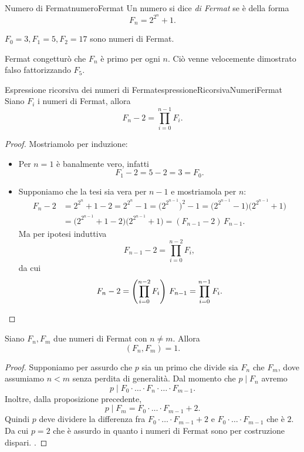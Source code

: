 	\begin{defn}{Numero di Fermat}{numeroFermat}
	Un numero si dice \emph{di Fermat} se è della forma
		\[
		F_n = 2^{2^n}+1.
		\]
	\end{defn}

	\begin{ese}
	\(F_0=3,F_1=5,F_2=17\) sono numeri di Fermat.
	\end{ese}

	\begin{oss}
	Fermat congetturò che \(F_n\) è primo per ogni \(n\).
	Ciò venne velocemente dimostrato falso fattorizzando \(F_5\).
	\end{oss}

	\begin{prop}{Espressione ricorsiva dei numeri di Fermat}{espressioneRicorsivaNumeriFermat}
	Siano \(F_i\) i numeri di Fermat, allora
		\[
		F_n-2 = \prod_{i=0}^{n-1} F_i.
		\]
	\end{prop}

	\begin{proof}
	Mostriamolo per induzione:
	\begin{itemize}
		\item Per \(n=1\) è banalmente vero, infatti
			\[
			F_1 -2 = 5-2 = 3 = F_0.
			\]
		\item Supponiamo che la tesi sia vera per \(n-1\) e mostriamola per \(n\):
			\[
			\begin{split}
			F_n-2 & = 2^{2^n}+1-2 = 2^{2^n}-1 = \big(2^{2^{n-1}}\big)^2-1 = \big(2^{2^{n-1}}-1\big)\big(2^{2^{n-1}}+1\big)\\
			& = \big(2^{2^{n-1}}+1-2\big)\big(2^{2^{n-1}}+1\big) = (F_{n-1}-2)\,F_{n-1}.
			\end{split}
			\]
		Ma per ipotesi induttiva
			\[
			F_{n-1}-2 = \prod_{i=0}^{n-2}F_i,
			\]
		da cui
			\[
			F_n -2 = \left( \prod_{i=0}^{n-2}F_i \right)\,F_{n-1} = \prod_{i=0}^{n-1}F_i.\qedhere
			\]
	\end{itemize}
	\end{proof}

	\begin{cor}
	Siano \(F_n,F_m\) due numeri di Fermat con \(n\neq m\). Allora
		\[
		(F_n,F_m) = 1.
		\]
	\end{cor}

	\begin{proof}
	Supponiamo per assurdo che \(p\) sia un primo che divide sia \(F_n\) che \(F_m\), dove assumiamo \(n<m\) senza perdita di generalità.
	Dal momento che \(p\mid F_n\) avremo
		\[
		p \mid F_0 \cdot\ldots\cdot F_n \cdot\ldots\cdot F_{m-1}.
		\]
	Inoltre, dalla proposizione precedente,
		\[
		p \mid F_m = F_0 \cdot\ldots\cdot F_{m-1} +2.
		\]
	Quindi \(p\) deve dividere la differenza fra \(F_0 \cdot\ldots\cdot F_{m-1}+2\) e \(F_0 \cdot\ldots\cdot F_{m-1}\) che è \(2\).
	Da cui \(p=2\) che è assurdo in quanto i numeri di Fermat sono per costruzione dispari.
.	\end{proof}

